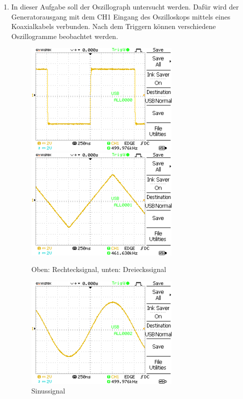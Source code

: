 \documentclass{article}
\begin{document}
     \begin{enumerate}[label=\alph*]
         \item In dieser Aufgabe soll der Oszillograph untersucht werden. Dafür wird der Generatorausgang mit dem CH1 Eingang des Oszilloskops mittels eines Koaxialkabels verbunden. Nach dem Triggern können verschiedene Oszillogramme beobachtet werden.
         
         \begin{figure}[H]
             \centering
             \includegraphics[width=0.7\textwidth]{MesswerteVersuch0/A0000DS.png}
             \includegraphics[width=0.7\textwidth]{MesswerteVersuch0/A0001DS.png}
             \caption{Oben: Rechtecksignal, unten: Dreieckssignal}
             \label{fig:A0000DS,1}
         \end{figure}
         
         \begin{figure}[H]
             \centering
             \includegraphics[width=0.7\textwidth]{MesswerteVersuch0/A0002DS.png}
             \caption{Sinussignal}
             \label{fig:A0002DS}
         \end{figure}


\end{enumerate}
\end{document}

